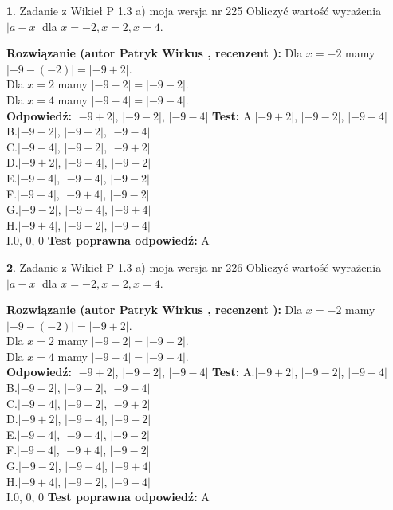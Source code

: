 \documentclass[12pt, a4paper]{article}
\theoremstyle{definition} %
\newtheorem{zad}{}
\newcommand{\zadStart}[1]{\begin{zad}#1\newline}
\newcommand{\zadStop}{\end{zad}}
\newcommand{\rozwStart}[2]{\noindent \textbf{Rozwiązanie (autor #1 , recenzent #2): }\newline}
\newcommand{\rozwStop}{\newline}
\newcommand{\odpStart}{\noindent \textbf{Odpowiedź:}\newline}
\newcommand{\odpStop}{\newline}
\newcommand{\testStart}{\noindent \textbf{Test:}\newline}
\newcommand{\testStop}{\newline}
\newcommand{\kluczStart}{\noindent \textbf{Test poprawna odpowiedź:}\newline}
\newcommand{\kluczStop}{\newline}
\begin{document}
\zadStart{Zadanie z Wikieł P 1.3 a) moja wersja nr 225}
Obliczyć wartość wyrażenia $|a - x|$ dla $x=-2,x=2,x=4$.
\zadStop
\rozwStart{Patryk Wirkus}{}
Dla $x = -2$ mamy $|-9 - (-2)| = |-9 + 2|$.\\
Dla $x = 2$ mamy $|-9 - 2| = |-9 - 2|$.\\
Dla $x = 4$ mamy $|-9 - 4| = |-9 - 4|$.\\
\rozwStop
\odpStart
$|-9 + 2|$, $|-9 - 2|$, $|-9 - 4|$
\odpStop
\testStart
A.$|-9 + 2|$, $|-9 - 2|$, $|-9 - 4|$\\
B.$|-9 - 2|$, $|-9 + 2|$, $|-9 - 4|$\\
C.$|-9 - 4|$, $|-9 - 2|$, $|-9 + 2|$\\
D.$|-9 + 2|$, $|-9 - 4|$, $|-9 - 2|$\\
E.$|-9 + 4|$, $|-9 - 4|$, $|-9 - 2|$\\
F.$|-9 - 4|$, $|-9 + 4|$, $|-9 - 2|$\\
G.$|-9 - 2|$, $|-9 - 4|$, $|-9 + 4|$\\
H.$|-9 + 4|$, $|-9 - 2|$, $|-9 - 4|$\\
I.$0$, $0$, $0$
\testStop
\kluczStart
A
\kluczStop



\zadStart{Zadanie z Wikieł P 1.3 a) moja wersja nr 226}
Obliczyć wartość wyrażenia $|a - x|$ dla $x=-2,x=2,x=4$.
\zadStop
\rozwStart{Patryk Wirkus}{}
Dla $x = -2$ mamy $|-9 - (-2)| = |-9 + 2|$.\\
Dla $x = 2$ mamy $|-9 - 2| = |-9 - 2|$.\\
Dla $x = 4$ mamy $|-9 - 4| = |-9 - 4|$.\\
\rozwStop
\odpStart
$|-9 + 2|$, $|-9 - 2|$, $|-9 - 4|$
\odpStop
\testStart
A.$|-9 + 2|$, $|-9 - 2|$, $|-9 - 4|$\\
B.$|-9 - 2|$, $|-9 + 2|$, $|-9 - 4|$\\
C.$|-9 - 4|$, $|-9 - 2|$, $|-9 + 2|$\\
D.$|-9 + 2|$, $|-9 - 4|$, $|-9 - 2|$\\
E.$|-9 + 4|$, $|-9 - 4|$, $|-9 - 2|$\\
F.$|-9 - 4|$, $|-9 + 4|$, $|-9 - 2|$\\
G.$|-9 - 2|$, $|-9 - 4|$, $|-9 + 4|$\\
H.$|-9 + 4|$, $|-9 - 2|$, $|-9 - 4|$\\
I.$0$, $0$, $0$
\testStop
\kluczStart
A
\kluczStop
\end{document}
